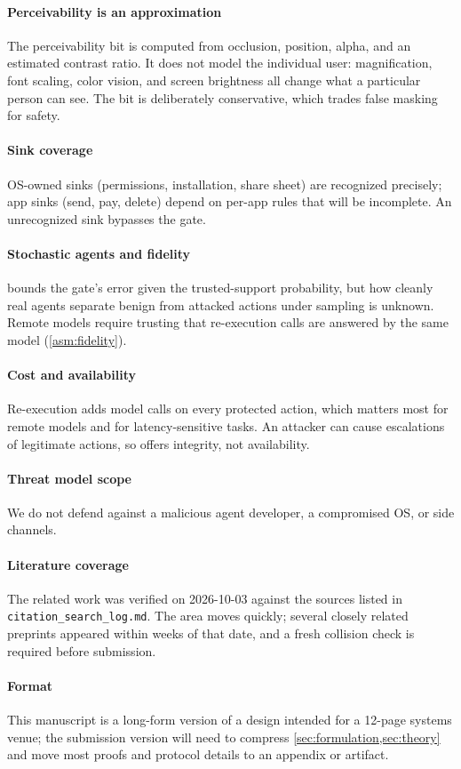 \paragraph{Perceivability is an approximation} The perceivability bit is computed from occlusion, position, alpha, and an estimated contrast ratio. It does not model the individual user: magnification, font scaling, color vision, and screen brightness all change what a particular person can see. The bit is deliberately conservative, which trades false masking for safety.

\paragraph{Sink coverage} OS-owned sinks (permissions, installation, share sheet) are recognized precisely; app sinks (send, pay, delete) depend on per-app rules that will be incomplete. An unrecognized sink bypasses the gate.

\paragraph{Stochastic agents and fidelity}  bounds the gate's error given the trusted-support probability, but how cleanly real agents separate benign from attacked actions under sampling is unknown. Remote models require trusting that re-execution calls are answered by the same model (\cref{asm:fidelity}).

\paragraph{Cost and availability} Re-execution adds model calls on every protected action, which matters most for remote models and for latency-sensitive tasks. An attacker can cause escalations of legitimate actions, so \PG{} offers integrity, not availability.

\paragraph{Threat model scope} We do not defend against a malicious agent developer, a compromised OS, or side channels.

\paragraph{Literature coverage} The related work was verified on 2026-10-03 against the sources listed in \texttt{citation\_search\_log.md}. The area moves quickly; several closely related preprints appeared within weeks of that date, and a fresh collision check is required before submission.

\paragraph{Format} This manuscript is a long-form version of a design intended for a 12-page systems venue; the submission version will need to compress \cref{sec:formulation,sec:theory} and move most proofs and protocol details to an appendix or artifact.
